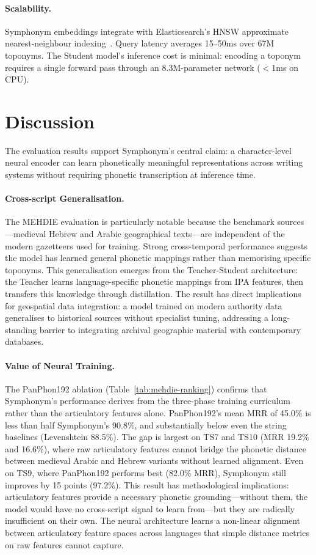 \documentclass[11pt,a4paper]{article}
\begin{document}
\paragraph{Scalability.} Symphonym embeddings integrate with Elasticsearch's HNSW approximate nearest-neighbour indexing~\citep{malkov2020hnsw}. Query latency averages 15--50ms over 67M toponyms. The Student model's inference cost is minimal: encoding a toponym requires a single forward pass through an 8.3M-parameter network ($<$1ms on CPU).

\section{Discussion}
\label{sec:discussion}

The evaluation results support Symphonym's central claim: a character-level neural encoder can learn phonetically meaningful representations across writing systems without requiring phonetic transcription at inference time.

\paragraph{Cross-script Generalisation.} The MEHDIE evaluation is particularly notable because the benchmark sources---medieval Hebrew and Arabic geographical texts---are independent of the modern gazetteers used for training. Strong cross-temporal performance suggests the model has learned general phonetic mappings rather than memorising specific toponyms. This generalisation emerges from the Teacher-Student architecture: the Teacher learns language-specific phonetic mappings from IPA features, then transfers this knowledge through distillation. The result has direct implications for geospatial data integration: a model trained on modern authority data generalises to historical sources without specialist tuning, addressing a long-standing barrier to integrating archival geographic material with contemporary databases.

\paragraph{Value of Neural Training.} The PanPhon192 ablation (Table~\ref{tab:mehdie-ranking}) confirms that Symphonym's performance derives from the three-phase training curriculum rather than the articulatory features alone. PanPhon192's mean MRR of 45.0\% is less than half Symphonym's 90.8\%, and substantially below even the string baselines (Levenshtein 88.5\%). The gap is largest on TS7 and TS10 (MRR 19.2\% and 16.6\%), where raw articulatory features cannot bridge the phonetic distance between medieval Arabic and Hebrew variants without learned alignment. Even on TS9, where PanPhon192 performs best (82.0\% MRR), Symphonym still improves by 15 points (97.2\%). This result has methodological implications: articulatory features provide a necessary phonetic grounding---without them, the model would have no cross-script signal to learn from---but they are radically insufficient on their own. The neural architecture learns a non-linear alignment between articulatory feature spaces across languages that simple distance metrics on raw features cannot capture.
\end{document}
